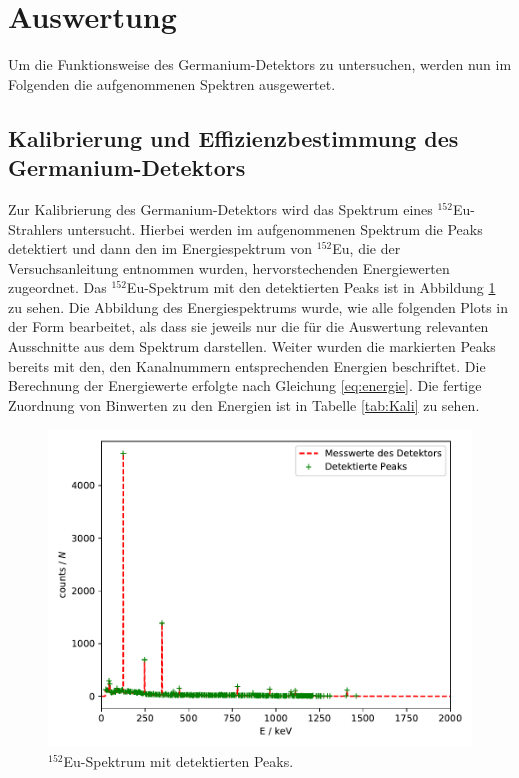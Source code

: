 \section{Auswertung}
Um die Funktionsweise des Germanium-Detektors zu untersuchen, werden nun im Folgenden die aufgenommenen Spektren ausgewertet.

\subsection{Kalibrierung und Effizienzbestimmung des Germanium-Detektors}

Zur Kalibrierung des Germanium-Detektors wird das Spektrum eines $^{152}$Eu-Strahlers untersucht. Hierbei
werden im aufgenommenen Spektrum die Peaks detektiert und dann den im Energiespektrum von $^{152}$Eu, die der
Versuchsanleitung \cite{Q1} entnommen wurden, hervorstechenden Energiewerten zugeordnet. Das
$^{152}$Eu-Spektrum mit den detektierten Peaks ist in
Abbildung \ref{abb:Europiumspektrum} zu sehen. Die Abbildung des
Energiespektrums wurde, wie alle folgenden Plots in der Form bearbeitet, als
dass sie jeweils nur die für die Auswertung relevanten Ausschnitte aus dem
Spektrum darstellen. Weiter wurden die markierten Peaks bereits mit den, den
Kanalnummern entsprechenden Energien beschriftet. Die Berechnung der
Energiewerte erfolgte nach Gleichung \ref{eq:energie}.
Die fertige Zuordnung von Binwerten zu den Energien ist in Tabelle
\ref{tab:Kali} zu sehen.
\FloatBarrier
\begin{figure}
    \centering
    \includegraphics[scale=0.7]{Detektormesswerte.pdf}
    \caption{$^{152}$Eu-Spektrum mit detektierten Peaks.}
    \label{abb:Europiumspektrum}
\end{figure}
\FloatBarrier

